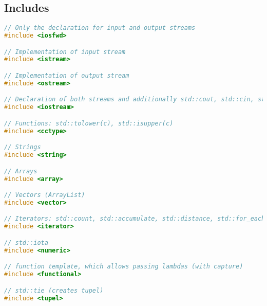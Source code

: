 
\subsection{Includes}
\begin{lstlisting}[style=frame, style= linenumbers, language=C]
// Only the declaration for input and output streams
#include <iosfwd>

// Implementation of input stream
#include <istream>

// Implementation of output stream
#include <ostream>

// Declaration of both streams and additionally std::cout, std::cin, std::cerr
#include <iostream>

// Functions: std::tolower(c), std::isupper(c)
#include <cctype>

// Strings
#include <string>

// Arrays
#include <array>

// Vectors (ArrayList)
#include <vector>

// Iterators: std::count, std::accumulate, std::distance, std::for_each
#include <iterator>

// std::iota
#include <numeric>

// function template, which allows passing lambdas (with capture)
#include <functional>

// std::tie (creates tupel)
#include <tupel>
\end{lstlisting}